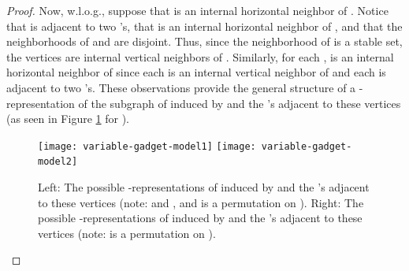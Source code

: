 \documentclass[11pt,3p,times]{elsarticle}
\newenvironment{myproof}{\begin{proof}}{\end{proof}}
\begin{document}
\begin{myproof}
Now, w.l.o.g., suppose that  is an internal horizontal neighbor
of . Notice that  is adjacent to two 's, that  is an internal
horizontal neighbor of , and that the neighborhoods of  and 
are disjoint. Thus, since the neighborhood of  is a stable set,
the vertices  are internal vertical neighbors of
. Similarly, for each ,  is an internal
horizontal neighbor of  since each  is an internal
vertical neighbor of  and each  is adjacent to two 's.
These observations provide the general structure of a
-representation of the subgraph of  induced by
        and the
's adjacent to these vertices (as seen in Figure
\ref{fig:var-gadget} for ).
\begin{figure}[h]
\hfill
\texttt{[image: variable-gadget-model1]}
\hfill
\texttt{[image: variable-gadget-model2]}
\hfill \ 
\caption{Left: The possible -representations of 
induced by      
    and the 's adjacent to
these vertices (note:  and
, and  is a
permutation on ). Right: The possible
-representations of  induced by   
     and the 's adjacent to
these vertices (note:  is a permutation on ).} \label{fig:var-gadget}
\end{figure}




\end{myproof}
\end{document}

